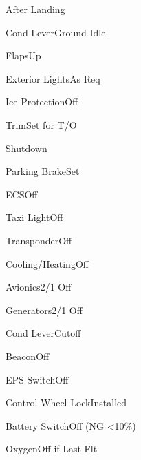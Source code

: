 \documentclass[sim-use]{checklist}
\begin{document}
\begin{checklist}{After Landing}
  \item{Cond Lever}{Ground Idle}
  \item{Flaps}{Up}
  \item{Exterior Lights}{As Req}
  \item{Ice Protection}{Off}
  \item{Trim}{Set for T/O}
\end{checklist}

\begin{checklist}{Shutdown}
  \item{Parking Brake}{Set}
  \item{ECS}{Off}
  \item{Taxi Light}{Off}
  \item{Transponder}{Off}
  \item{Cooling/Heating}{Off}
  \item{Avionics}{2/1 Off}
  \item{Generators}{2/1 Off}
  \item{Cond Lever}{Cutoff}
  \item{Beacon}{Off}
  \item{EPS Switch}{Off}
  \item{Control Wheel Lock}{Installed}
  \item{Battery Switch}{Off (NG <10\%)}
  \item{Oxygen}{Off if Last Flt}
\end{checklist}
\end{document}
